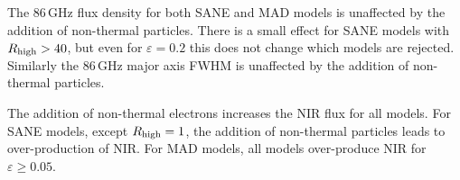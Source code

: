 The 86\,GHz flux density for both SANE and MAD models is unaffected by the addition of non-thermal particles.  There is a small effect for SANE models with $R_\mathrm{high}>40$, but even for $\varepsilon = 0.2$ this does not change which models are rejected.  Similarly the 86\,GHz major axis FWHM is unaffected by the addition of non-thermal particles.






The addition of non-thermal electrons increases the NIR flux for all models. For SANE models, except $R_\mathrm{high}=1$, the addition of non-thermal particles leads to over-production of NIR. For MAD models, all models over-produce NIR for $\varepsilon \ge 0.05$.


